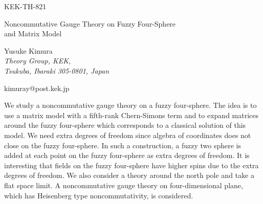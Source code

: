 \documentclass[a4paper,11pt]{article}
\begin{document}
\def\slash#1{{\rlap{\myHighlight{$#1$}\coordHE{}} \thinspace/}}

\begin{flushright} 
KEK-TH-821 \\
\end{flushright} 

\vspace{0.1cm}

\begin{Large}
       \vspace{1cm}
  \begin{center}
   {Noncommutative Gauge Theory on Fuzzy Four-Sphere \\
   and Matrix Model  }      \\
  \end{center}
\end{Large}
\vspace{1cm}

\begin{center}
{\large  Yusuke Kimura }  \\ 


\vspace{0.5cm} 
{\it Theory Group, KEK, }\\
{\it Tsukuba, Ibaraki 305-0801, Japan} \\

\vspace{0.5cm} 

{kimuray@post.kek.jp}

\vspace{0.8cm} 


\end{center}


 \vspace{1cm}



\begin{abstract}
\noindent
\end{abstract}
\noindent 
\hspace{0.4cm}
We study a noncommutative gauge theory on a fuzzy four-sphere. 
The idea is to use a matrix model with a fifth-rank Chern-Simons term 
and to expand matrices around the fuzzy four-sphere 
which corresponds to a classical solution of this model. 
We need extra degrees of freedom since algebra of coordinates 
does not close on the fuzzy four-sphere. 
In such a construction, 
a fuzzy two sphere is added 
at each point on the fuzzy four-sphere 
as extra degrees of freedom. 
It is interesting that fields on the fuzzy four-sphere have 
higher spins due to the extra degrees of freedom. 
We also consider a theory around the north pole and 
take a flat space limit. 
A noncommutative gauge theory on four-dimensional plane, 
which has Heisenberg type noncommutativity, is considered. 
\end{document}
